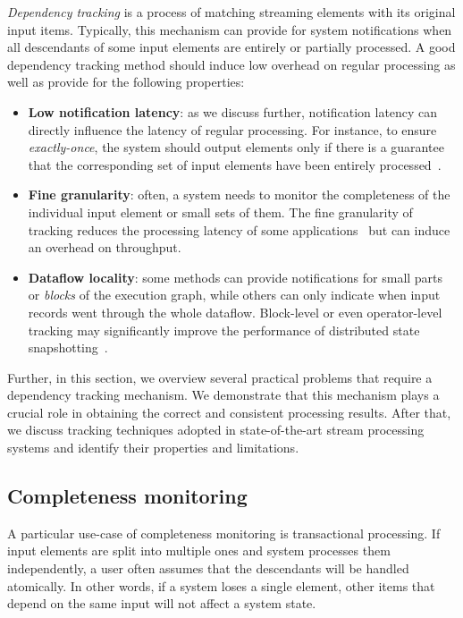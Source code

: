 {\em Dependency tracking} is a process of matching streaming elements with its original input items. Typically, this mechanism can provide for system notifications when all descendants of some input elements are entirely or partially processed. A good dependency tracking method should induce low overhead on regular processing as well as provide for the following properties:
\begin{itemize}
    \item {\bf Low notification latency}: as we discuss further, notification latency can directly influence the latency of regular processing. For instance, to ensure {\em exactly-once}, the system should output elements only if there is a guarantee that the corresponding set of input elements have been entirely processed~\cite{thepaper}.
    \item {\bf Fine granularity}: often, a system needs to monitor the completeness of the individual input element or small sets of them. The fine granularity of tracking reduces the processing latency of some applications~\cite{we2018adbis} but can induce an overhead on throughput.
    \item {\bf Dataflow locality}: some methods can provide notifications for small parts or {\em blocks} of the execution graph, while others can only indicate when input records went through the whole dataflow. Block-level or even operator-level tracking may significantly improve the performance of distributed state snapshotting~\cite{Carbone:2017:SMA:3137765.3137777, 2015arXiv150608603C}.
\end{itemize}

Further, in this section, we overview several practical problems that require a dependency tracking mechanism. We demonstrate that this mechanism plays a crucial role in obtaining the correct and consistent processing results. After that, we discuss tracking techniques adopted in state-of-the-art stream processing systems and identify their properties and limitations. 

\subsection{Completeness monitoring}

A particular use-case of completeness monitoring is transactional processing. If input elements are split into multiple ones and system processes them independently, a user often assumes that the descendants will be handled atomically. In other words, if a system loses a single element, other items that depend on the same input will not affect a system state. 

